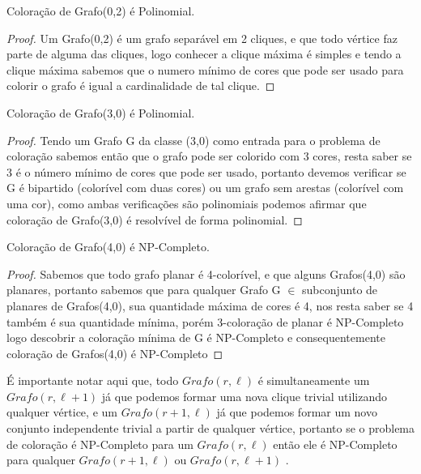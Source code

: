 	\begin{teorema}
		Coloração de Grafo(0,2) é Polinomial.
	\end{teorema}
	\begin{proof}
		Um Grafo(0,2) é um grafo separável em 2 cliques, e que todo vértice faz parte de alguma das cliques, logo conhecer a clique máxima é simples e tendo a clique máxima sabemos que o numero mínimo de cores que pode ser usado para colorir o grafo é igual a cardinalidade de tal clique.
	\end{proof}

	\begin{teorema}
		Coloração de Grafo(3,0) é Polinomial.
	\end{teorema}
	\begin{proof}
		Tendo um Grafo G da classe (3,0) como entrada para o problema de coloração sabemos então que o grafo pode ser colorido com 3 cores, resta saber se 3 é o número mínimo de cores que pode ser usado, portanto devemos verificar se G é bipartido (colorível com duas cores) ou um grafo sem arestas (colorível com uma cor), como ambas verificações são polinomiais podemos afirmar que coloração de Grafo(3,0) é resolvível de forma polinomial.
	\end{proof}

	\begin{teorema}
		Coloração de Grafo(4,0) é NP-Completo.
	\end{teorema}
	\begin{proof}
		Sabemos que todo grafo planar é 4-colorível, e que alguns Grafos(4,0) são planares, portanto sabemos que para qualquer Grafo G $\in$ subconjunto de planares de Grafos(4,0), sua quantidade máxima de cores é 4, nos resta saber se 4 também é sua quantidade mínima, porém 3-coloração de planar é NP-Completo logo descobrir a coloração mínima de G é NP-Completo e consequentemente coloração de Grafos(4,0) é NP-Completo
	\end{proof}

É importante notar aqui que, todo $Grafo(r,\ell)$ é simultaneamente um $Grafo(r,\ell+1)$ já que podemos formar uma nova clique trivial utilizando qualquer vértice, e um $Grafo(r+1,\ell)$ já que podemos formar um novo conjunto independente trivial a partir de qualquer vértice, portanto se o problema de coloração é NP-Completo para um $Grafo(r,\ell)$ então ele é NP-Completo para qualquer $Grafo(r+1,\ell)$ ou $Grafo(r,\ell+1)$ .

